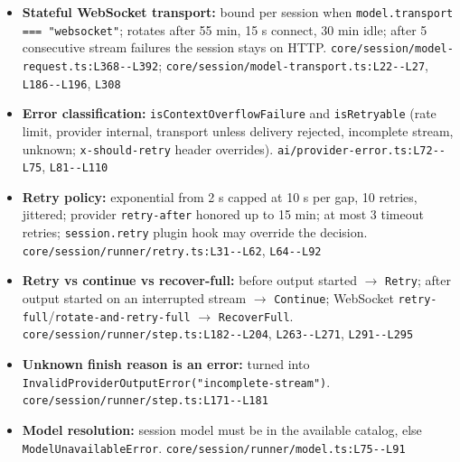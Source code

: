 \begin{itemize}
\item \textbf{Stateful WebSocket transport:} bound per session when \texttt{model.\allowbreak{}transport === "websocket"}; rotates after 55 min, 15 s connect, 30 min idle; after 5 consecutive stream failures the session stays on HTTP. \texttt{core/\allowbreak{}session/\allowbreak{}model-\allowbreak{}request.\allowbreak{}ts:\allowbreak{}L368-\allowbreak{}-\allowbreak{}L392}; \texttt{core/\allowbreak{}session/\allowbreak{}model-\allowbreak{}transport.\allowbreak{}ts:\allowbreak{}L22-\allowbreak{}-\allowbreak{}L27}, \texttt{L186-\allowbreak{}-\allowbreak{}L196}, \texttt{L308}
\item \textbf{Error classification:} \texttt{isContextOverflowFailure} and \texttt{isRetryable} (rate limit, provider internal, transport unless delivery rejected, incomplete stream, unknown; \texttt{x-\allowbreak{}should-\allowbreak{}retry} header overrides). \texttt{ai/\allowbreak{}provider-\allowbreak{}error.\allowbreak{}ts:\allowbreak{}L72-\allowbreak{}-\allowbreak{}L75}, \texttt{L81-\allowbreak{}-\allowbreak{}L110}
\item \textbf{Retry policy:} exponential from 2 s capped at 10 s per gap, 10 retries, jittered; provider \texttt{retry-\allowbreak{}after} honored up to 15 min; at most 3 timeout retries; \texttt{session.\allowbreak{}retry} plugin hook may override the decision. \texttt{core/\allowbreak{}session/\allowbreak{}runner/\allowbreak{}retry.\allowbreak{}ts:\allowbreak{}L31-\allowbreak{}-\allowbreak{}L62}, \texttt{L64-\allowbreak{}-\allowbreak{}L92}
\item \textbf{Retry vs continue vs recover-full:} before output started $\rightarrow$ \texttt{Retry}; after output started on an interrupted stream $\rightarrow$ \texttt{Continue}; WebSocket \texttt{retry-\allowbreak{}full}/\texttt{rotate-\allowbreak{}and-\allowbreak{}retry-\allowbreak{}full} $\rightarrow$ \texttt{RecoverFull}. \texttt{core/\allowbreak{}session/\allowbreak{}runner/\allowbreak{}step.\allowbreak{}ts:\allowbreak{}L182-\allowbreak{}-\allowbreak{}L204}, \texttt{L263-\allowbreak{}-\allowbreak{}L271}, \texttt{L291-\allowbreak{}-\allowbreak{}L295}
\item \textbf{Unknown finish reason is an error:} turned into \texttt{InvalidProviderOutputError(\allowbreak{}"incomplete-\allowbreak{}stream")}. \texttt{core/\allowbreak{}session/\allowbreak{}runner/\allowbreak{}step.\allowbreak{}ts:\allowbreak{}L171-\allowbreak{}-\allowbreak{}L181}
\item \textbf{Model resolution:} session model must be in the available catalog, else \texttt{ModelUnavailableError}. \texttt{core/\allowbreak{}session/\allowbreak{}runner/\allowbreak{}model.\allowbreak{}ts:\allowbreak{}L75-\allowbreak{}-\allowbreak{}L91}

\end{itemize}
